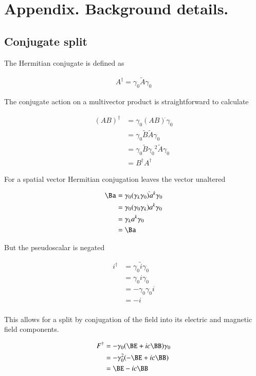 \section{Appendix.  Background details.}

\subsection{Conjugate split}

The Hermitian conjugate is defined as

\begin{align}
A^\dagger = \gamma_0 \tilde{A} \gamma_0
\end{align}

The conjugate action on a multivector product is straightforward to calculate

\begin{align*}
(A B)^\dagger
&= \gamma_0 (A B)^{\tilde{}} \gamma_0 \\
&= \gamma_0 \tilde{B} \tilde{A} \gamma_0 \\
&= \gamma_0 \tilde{B} {\gamma_0}^2 \tilde{A} \gamma_0 \\
&= B^\dagger A^\dagger
\end{align*}

For a spatial vector Hermitian conjugation leaves the vector unaltered

\begin{align*}
\Ba
&= \gamma_0 (\gamma_k \gamma_0)^{\tilde{}} a^k \gamma_0 \\
&= \gamma_0 (\gamma_0 \gamma_k) a^k \gamma_0 \\
&= \gamma_k a^k \gamma_0 \\
&= \Ba
\end{align*}

But the pseudoscalar is negated

\begin{align*}
i^\dagger
&=
\gamma_0 \tilde{i} \gamma_0 \\
&=
\gamma_0 i \gamma_0 \\
&=
-\gamma_0 \gamma_0 i \\
&=
- i \\
\end{align*}

This allows for a split by conjugation of the field into its electric and magnetic field components.

\begin{align*}
F^\dagger
&= -\gamma_0 ( \BE + i c \BB) \gamma_0 \\
&= -\gamma_0^2 ( -\BE + i c \BB) \\
&= \BE - i c\BB \\
\end{align*}

